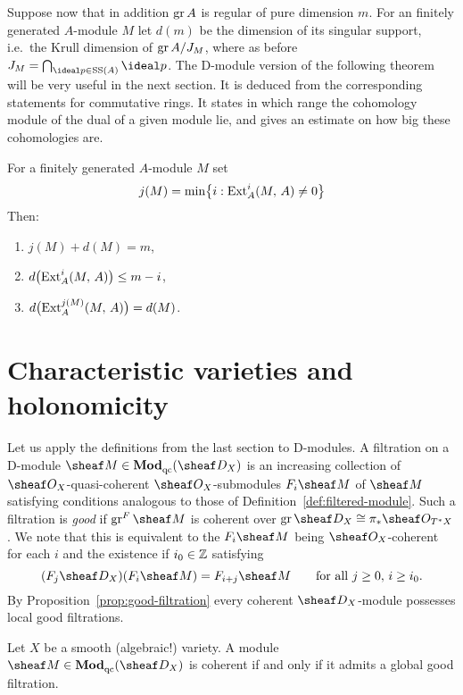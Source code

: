 \documentclass[number-in-sections,a4paper]{notes}
\begin{document}
Suppose now that in addition $\operatorname{gr} A$ is regular of pure dimension $m$.
For an finitely generated $A$-module $M$ let $d(m)$ be the dimension of its singular support, i.e.~the Krull dimension of $\operatorname{gr} A/J_M$, where as before $J_M = \bigcap_{\ideal p \in \SSupp(A)} \ideal p$.
The D-module version of the following theorem will be very useful in the next section.
It is deduced from the corresponding statements for commutative rings.
It states in which range the cohomology module of the dual of a given module lie, and gives an estimate on how big these cohomologies are.

\begin{Theorem}\label{thm:Ext-dim-estimates-ring}
    For a finitely generated $A$-module $M$ set
    \[
        j(M) = \min\bigl\{ i : \operatorname{Ext}_A^i(M,\, A) \ne 0 \bigr\}
    \]
    Then:
    \begin{enumerate}
        \item $j(M) + d(M) = m$,
        \item $d\bigl(\operatorname{Ext}^i_A(M,\, A)\bigr) \le m - i$,
        \item $d\bigl(\operatorname{Ext}^{j(M)}_A(M,\, A)\bigr) = d(M)$.
    \end{enumerate}
\end{Theorem}

\section{Characteristic varieties and holonomicity}

Let us apply the definitions from the last section to D-modules.
A filtration on a D-module $\sheaf M \in \catDModqc{X}$ is an increasing collection of $\sO_X$-quasi-coherent $\sO_X$-submodules $F_i\sheaf M$ of $\sheaf M$ satisfying conditions analogous to those of Definition~\ref{def:filtered-module}.
Such a filtration is \emph{good} if $\gr^F \sheaf M$ is coherent over $\gr \sD_X \cong \pi_*\sO_{T^*X}$.
We note that this is equivalent to the $F_i\sheaf M$ being $\sO_X$-coherent for each $i$ and the existence if $i_0 \in {\mathbb{Z}}$ satisfying
\[
    (F_j\sD_X)(F_i\sheaf M) = F_{i+j}\sheaf M \qquad \text{for all } j \ge 0,\, i \ge i_0.
\]
By Proposition~\ref{prop:good-filtration} every coherent $\sD_X$-module possesses local good filtrations.

\begin{Proposition}
    Let $X$ be a smooth (algebraic!) variety.
    A module $\sheaf M \in \catDModqc{X}$ is coherent if and only if it admits a global good filtration.
\end{Proposition}
\end{document}
